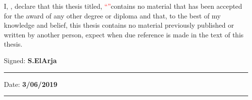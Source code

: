 \documentclass[
12pt, %
english, %
onehalfspacing, %
headsepline, %
]{MastersDoctoralThesis} %
\begin{document}

\begin{declaration}
\addchaptertocentry{\authorshipname} %

\noindent I, \authorname, declare that this thesis titled, \textcolor{red}{\enquote{\ttitle}}contains no material that has been accepted for the award of any other degree or diploma and that, to the best of my knowledge and belief, this thesis contains no material previously published or written by another person, expect when due reference is made in the text of this thesis.

\noindent Signed: \textbf{S.ElArja}\\
\rule[0.5em]{25em}{0.5pt} %
 
\noindent Date: \textbf{3/06/2019}\\
\rule[0.5em]{25em}{0.5pt} %
\end{declaration}


\cleardoublepage







\end{document}
